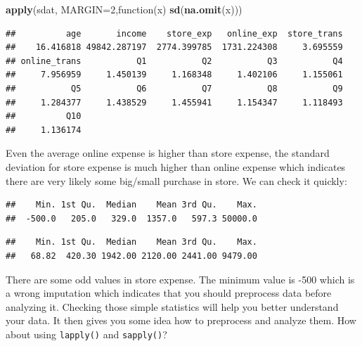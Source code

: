\documentclass[]{book}
\newenvironment{Shaded}{\begin{snugshade}}{\end{snugshade}}
\newcommand{\KeywordTok}[1]{\textcolor[rgb]{0.13,0.29,0.53}{\textbf{{#1}}}}
\newcommand{\DataTypeTok}[1]{\textcolor[rgb]{0.13,0.29,0.53}{{#1}}}
\newcommand{\DecValTok}[1]{\textcolor[rgb]{0.00,0.00,0.81}{{#1}}}
\newcommand{\NormalTok}[1]{{#1}}
\theoremstyle{definition}
\theoremstyle{definition}
\theoremstyle{remark}
\begin{document}
\begin{Shaded}
\begin{Highlighting}[]
\KeywordTok{apply}\NormalTok{(sdat, }\DataTypeTok{MARGIN=}\DecValTok{2}\NormalTok{,function(x) }\KeywordTok{sd}\NormalTok{(}\KeywordTok{na.omit}\NormalTok{(x)))}
\end{Highlighting}
\end{Shaded}

\begin{verbatim}
##          age       income    store_exp   online_exp  store_trans 
##    16.416818 49842.287197  2774.399785  1731.224308     3.695559 
## online_trans           Q1           Q2           Q3           Q4 
##     7.956959     1.450139     1.168348     1.402106     1.155061 
##           Q5           Q6           Q7           Q8           Q9 
##     1.284377     1.438529     1.455941     1.154347     1.118493 
##          Q10 
##     1.136174
\end{verbatim}

Even the average online expense is higher than store expense, the
standard deviation for store expense is much higher than online expense
which indicates there are very likely some big/small purchase in store.
We can check it quickly:

\begin{Shaded}
\end{Shaded}

\begin{verbatim}
##    Min. 1st Qu.  Median    Mean 3rd Qu.    Max. 
##  -500.0   205.0   329.0  1357.0   597.3 50000.0
\end{verbatim}

\begin{Shaded}
\end{Shaded}

\begin{verbatim}
##    Min. 1st Qu.  Median    Mean 3rd Qu.    Max. 
##   68.82  420.30 1942.00 2120.00 2441.00 9479.00
\end{verbatim}

There are some odd values in store expense. The minimum value is -500
which is a wrong imputation which indicates that you should preprocess
data before analyzing it. Checking those simple statistics will help you
better understand your data. It then gives you some idea how to
preprocess and analyze them. How about using \texttt{lapply()} and
\texttt{sapply()}?
\end{document}

